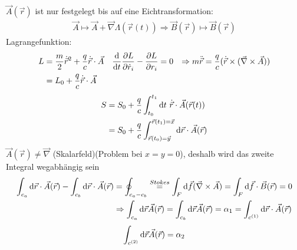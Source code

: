 $\vec{A}(\vec{r})$ ist nur festgelegt bis auf eine Eichtransformation:
	\begin{align*}
		\vec{A} \mapsto \vec{A} + \vec{\nabla} \Lambda (\vec{r}(t)) 
		\Rightarrow \vec{B}(\vec{r}) \mapsto \vec{B}(\vec{r})
	\end{align*}
Lagrangefunktion:
	\begin{align*}
		L &= \frac{m}{2} \dot{\vec{r}}^2 + \frac{q}{c} \dot{\vec{r}} \cdot \vec{A}
		& \frac{\mathrm{d}}{\mathrm{d} t} \frac{\partial L}{\partial \dot{r}_i} - \frac{\partial L}{\partial r_i} &= 0 &
		\Rightarrow m \ddot{\vec{r}} &= \frac{q}{c} (\dot{\vec{r}} \times(\vec{\nabla} \times \vec{A})) \\
		&= L_0 + \frac{q}{c} \dot{\vec{r}} \cdot \vec{A}
	\end{align*}
	\begin{align*}
		S &= S_0 + \frac{q}{c} \int_{t_0}^{t_1} \mathrm{d} t ~\dot{\vec{r}} \cdot \vec{A}(\vec{r}(t)) \\
		&= S_0 + \frac{q}{c} \int_{\vec{r}(t_0) = \vec{y}}^{\vec{r}(t_1) = \vec{x}} \mathrm{d} \vec{r} \cdot \vec{A}(\vec{r}) 
	\end{align*}
$\vec{A}(\vec{r}) \neq \vec{\nabla}$ (Skalarfeld)(Problem bei $x=y=0$), deshalb wird das zweite Integral wegabhängig sein
	\begin{align*}
		\int_{c_a} \mathrm{d} \vec{r} \cdot \vec{A}(\vec{r}) - \int_{c_b} \mathrm{d} \vec{r} \cdot \vec{A}(\vec{r}) &=
		\oint_{c_a-c_b} \overset{Stokes}{=} 
		\int_F \mathrm{d} \vec{f} (\vec{\nabla} \times \vec{A}) = \int_F \mathrm{d} \vec{f} \cdot \vec{B}(\vec{r}) =0 \\
		&\Rightarrow 
		\int_{c_a} \mathrm{d} \vec{r} \vec{A}(\vec{r}) = \int_{c_b} \mathrm{d} \vec{r} \vec{A}(\vec{r}) =
		\alpha_1 = \int_{c^{(1)}} \mathrm{d} \vec{r} \cdot \vec{A}(\vec{r})
	\end{align*}
	\begin{align*}
		\int_{c^{(2)}} \mathrm{d} \vec{r} \vec{A}(\vec{r}) = \alpha_2
	\end{align*}
